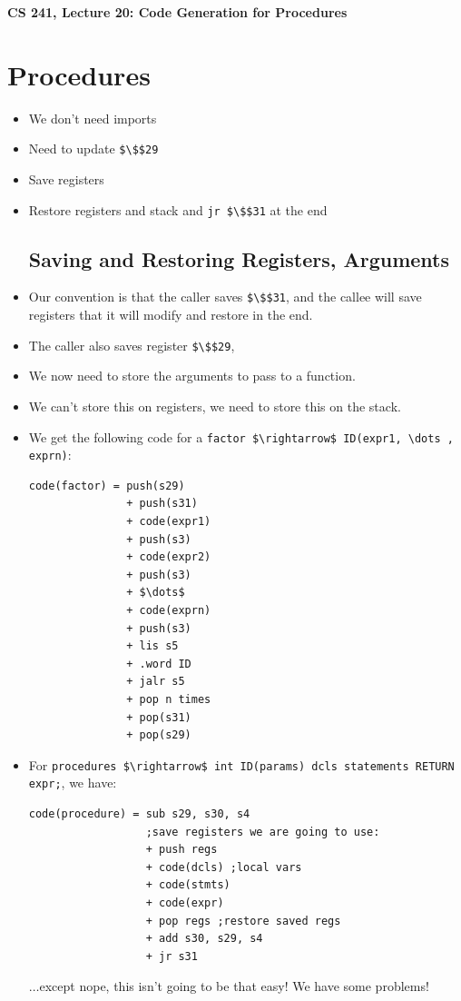 \documentclass[12pt]{article}
\author{Clement Tsang}
\begin{document}
\begin{center}
\Large\textbf{CS 241, Lecture 20: Code Generation for Procedures}
\end{center}

\section{Procedures}
\begin{itemize}
    \subsection{Differences between generic procedures and wain:}
        \item We don't need imports
        \item Need to update \lstinline[mathescape]{$\$$29}
        \item Save registers
        \item Restore registers and stack and \lstinline[mathescape]{jr $\$$31} at the end
    \subsection{Saving and Restoring Registers, Arguments}
        \item Our convention is that the caller saves \lstinline[mathescape]{$\$$31}, and the callee will save registers that it will modify and restore in the end.
        \item The caller also saves register \lstinline[mathescape]{$\$$29},  
        \item We now need to store the arguments to pass to a function.
        \item We can't store this on registers, we need to store this on the stack.
        \item We get the following code for a \lstinline[mathescape]{factor $\rightarrow$ ID(expr1, \dots , exprn)}:
\begin{lstlisting}[mathescape, numbers=none, breaklines=true]
code(factor) = push(s29) 
               + push(s31)
               + code(expr1) 
               + push(s3)
               + code(expr2) 
               + push(s3)
               + $\dots$
               + code(exprn)
               + push(s3)
               + lis s5
               + .word ID
               + jalr s5
               + pop n times
               + pop(s31) 
               + pop(s29)
\end{lstlisting}
        \item For \lstinline[mathescape]{procedures $\rightarrow$ int ID(params) dcls statements RETURN expr;}, we have:
\begin{lstlisting}[mathescape, numbers=none, breaklines=true]
code(procedure) = sub s29, s30, s4
                  ;save registers we are going to use:
                  + push regs
                  + code(dcls) ;local vars
                  + code(stmts)
                  + code(expr)
                  + pop regs ;restore saved regs
                  + add s30, s29, s4
                  + jr s31
\end{lstlisting}
        $\dots$except nope, this isn't going to be that easy!  We have some problems!

\end{itemize}
\end{document}
